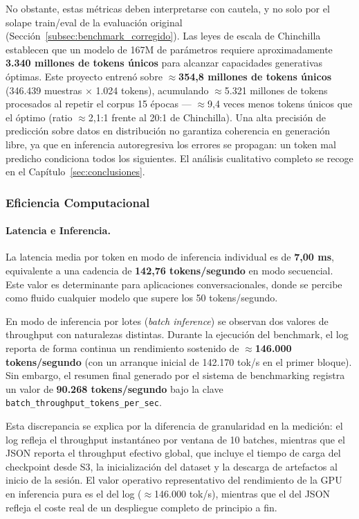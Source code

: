 No obstante, estas métricas deben interpretarse con cautela, y no solo por el solape train/eval de la evaluación original (Sección~\ref{subsec:benchmark_corregido}). Las leyes de escala de Chinchilla~\cite{hoffmann2022chinchilla} establecen que un modelo de 167M de parámetros requiere aproximadamente \textbf{3.340 millones de tokens únicos} para alcanzar capacidades generativas óptimas. Este proyecto entrenó sobre $\approx$\textbf{354,8 millones de tokens únicos} (346.439 muestras $\times$ 1.024 tokens), acumulando $\approx$5.321 millones de tokens procesados al repetir el corpus 15 épocas --- $\approx$9,4 veces menos tokens únicos que el óptimo (ratio $\approx$2,1:1 frente al 20:1 de Chinchilla). Una alta precisión de predicción sobre datos en distribución no garantiza coherencia en generación libre, ya que en inferencia autoregresiva los errores se propagan: un token mal predicho condiciona todos los siguientes. El análisis cualitativo completo se recoge en el Capítulo~\ref{sec:conclusiones}.

\subsubsection{Eficiencia Computacional}

\paragraph{Latencia e Inferencia.}
La latencia media por token en modo de inferencia individual es de \textbf{7,00 ms}, equivalente a una cadencia de \textbf{142,76 tokens/segundo} en modo secuencial. Este valor es determinante para aplicaciones conversacionales, donde se percibe como fluido cualquier modelo que supere los 50 tokens/segundo.

En modo de inferencia por lotes (\textit{batch inference}) se observan dos valores de throughput con naturalezas distintas. Durante la ejecución del benchmark, el log reporta de forma continua un rendimiento sostenido de $\approx$\textbf{146.000 tokens/segundo} (con un arranque inicial de 142.170 tok/s en el primer bloque). Sin embargo, el resumen final generado por el sistema de benchmarking registra un valor de \textbf{90.268 tokens/segundo} bajo la clave \texttt{batch\_throughput\_tokens\_per\_sec}.

Esta discrepancia se explica por la diferencia de granularidad en la medición: el log refleja el throughput instantáneo por ventana de 10 batches, mientras que el JSON reporta el throughput efectivo global, que incluye el tiempo de carga del checkpoint desde S3, la inicialización del dataset y la descarga de artefactos al inicio de la sesión. El valor operativo representativo del rendimiento de la GPU en inferencia pura es el del log ($\approx$146.000 tok/s), mientras que el del JSON refleja el coste real de un despliegue completo de principio a fin.

